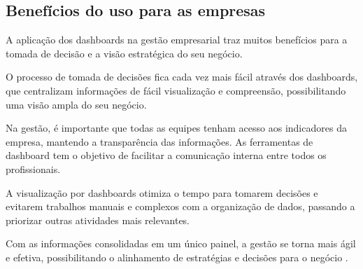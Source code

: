 \subsection{Benefícios do uso para as empresas}

\indent
\par A aplicação dos dashboards na gestão empresarial traz muitos benefícios para a tomada de decisão e a visão estratégica do seu negócio.

\par O processo de tomada de decisões fica cada vez mais fácil através dos dashboards, que centralizam informações de fácil visualização e compreensão, possibilitando uma visão ampla do seu negócio.

\par Na gestão, é importante que todas as equipes tenham acesso aos indicadores da empresa, mantendo a transparência das informações. As ferramentas de dashboard tem o objetivo de facilitar a comunicação interna entre todos os profissionais.

\par A visualização por dashboards otimiza o tempo para tomarem decisões e evitarem trabalhos manuais e complexos com a organização de dados, passando a priorizar outras atividades mais relevantes.

\par Com as informações consolidadas em um único painel, a gestão se torna mais ágil e efetiva, possibilitando o alinhamento de estratégias e decisões para o negócio \cite{Tecnicon}.


